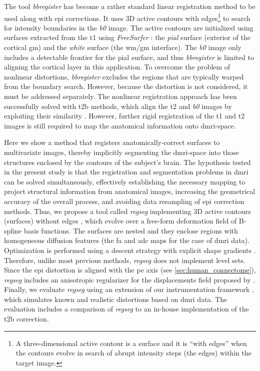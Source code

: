\documentclass[3p,authoryear,fleqn]{elsarticle}
\providecommand{\regseg}{\emph{regseg}}
\providecommand{\lowb}{\textit{b0}}
\begin{document}
The tool \emph{bbregister} \citep{greve_accurate_2009} has become a rather standard linear
  registration method to be used along with \gls*{epi} corrections.
It uses 3D active contours with edges\footnote{A three-dimensional active contour is a surface
  and it is ``with edges'' when the contours evolve in search of abrupt intensity steps (the edges) within
  the target image.} to search for intensity boundaries in the \lowb{} image.
The active contours are initialized using surfaces extracted from the \gls*{t1} using
  \emph{FreeSurfer} \citep{fischl_freesurfer_2012}: the \emph{pial} surface (exterior of the
  cortical \gls*{gm}) and the \emph{white} surface (the \gls*{wm}/\gls*{gm} interface).
The \lowb{} image only includes a detectable frontier for the pial surface, and thus
  \emph{bbregister} is limited to aligning the cortical layer in this
  application.
To overcome the problem of nonlinear distortions, \emph{bbregister} excludes the
  regions that are typically warped from the boundary search.
However, because the distortion is not considered, it must be addressed separately.
The nonlinear registration approach has been successfully solved with \gls*{t2b} methods,
  which align the \gls*{t2} and \lowb{} images by exploiting their similarity
  \citep{kybic_unwarping_2000,studholme_accurate_2000}.
However, further rigid registration of the \gls*{t1} and \gls*{t2} images is still required to
  map the anatomical information onto \gls*{dmri}-space.

Here we show a method that registers anatomically-correct surfaces to multivariate images,
  thereby implicitly segmenting the \gls*{dmri}-space into those structures enclosed by the contours
  of the subject's brain.
The hypothesis tested in the present study is that the registration and segmentation
  problems in \gls*{dmri} can be solved simultaneously, effectively establishing the
  necessary mapping to project structural information from anatomical images, increasing the
  geometrical accuracy of the overall process, and avoiding data resampling of \gls*{epi}
  correction methods.
Thus, we propose a tool called \regseg{} implementing 3D active contours (surfaces) without edges
  \citep{chan_active_2001}, which evolve over a free-form deformation field of B-spline
  basis functions.
The surfaces are nested and they enclose regions with homogeneous diffusion features
  (the \gls*{fa} and \gls*{adc} maps for the case of \gls*{dmri} data).
Optimization is performed using a descent strategy with explicit shape gradients
  \citep{besson_dream2s_2003,herbulot_segmentation_2006}.
Therefore, unlike most previous methods, \regseg{} does not implement level sets.
Since the \gls*{epi} distortion is aligned with the \gls*{pe} axis (see
  \autoref{sec:human_connectome}), \regseg{} includes an anisotropic regularizer for
  the displacements field proposed by \cite{nagel_investigation_1986}.
Finally, we evaluate \regseg{} using an extension of our instrumentation framework
  \citep{esteban_simulationbased_2014}, which simulates known and realistic distortions
  based on \gls*{dmri} data.
The evaluation includes a comparison of \regseg{} to an in-house implementation of
  the \gls*{t2b} correction.
 
\end{document}
